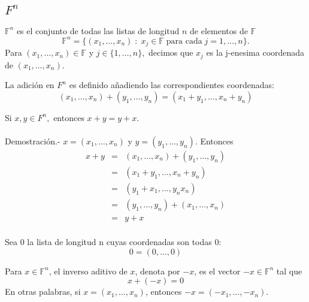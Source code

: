 \subsection{\boldmath $F^n$}

\begin{tcolorbox}[colback=white]
    \begin{def.} 
	$\mathbb{F}^n$ es el conjunto de todas las listas de longitud $n$ de elementos de $\mathbb{F}$
	$$\mathbb{F}^n = \lbrace (x_1,\ldots, x_n)\; : \; x_j \in \mathbb{F} \; \mbox{para cada}\; j = 1,\ldots, n\rbrace.$$
	Para $(x_1,\ldots, x_n)\in \mathbb{F}$ y $j\in \lbrace 1, \ldots, n\rbrace,$ decimos que $x_j$ es la j-enesima coordenada de $(x_1,\ldots, x_n)$.
    \end{def.}
\end{tcolorbox}

\begin{tcolorbox}[colback=white]
    \begin{def.}
	La adición en $F^n$ es definido añadiendo las correspondientes coordenadas: 
	$$(x_1,\ldots,x_n)+(y_1,\ldots, y_n)=(x_1+y_1,\ldots, x_n + y_n)$$
    \end{def.}
\end{tcolorbox}

\begin{teo}
    Si $x,y \in F^n,$ entonces $x+y=y+x$.\\\\
    Demostración.-\; $x=(x_1,\ldots, x_n)$ y $y=(y_1,\ldots, y_n)$. Entonces
    $$\begin{array}{rcl}
	x+y&=&(x_1,\ldots,x_n)+(y_1,\ldots,y_n)\\
	   &=&(x_1+y_1,\ldots, x_n + y_n)\\
	   &=&(y_1+x_1,\ldots, y_n x_n)\\
	   &=&(y_1,\ldots,y_n)+(x_1,\ldots,x_n)\\
	   &=&y+x\\
    \end{array}$$
\end{teo}

\begin{tcolorbox}[colback=white]
    \begin{def.}[$0$]
	Sea $0$ la lista de longitud n cuyas coordenadas son todas 0: 
	$$0=(0,\ldots,0)$$
    \end{def.}
\end{tcolorbox}

\begin{tcolorbox}[colback=white]
    \begin{def.}
	Para $x\in \mathbb{F}^n$, el inverso aditivo de $x$, denota por $-x$, es el vector $-x\in \mathbb{F}^n$ tal que $$x+(-x) =0$$
	En otras palabras, si $x=(x_1,\ldots,x_n)$, entonces $-x=(-x_1,\ldots,-x_n).$
    \end{def.}
\end{tcolorbox}


